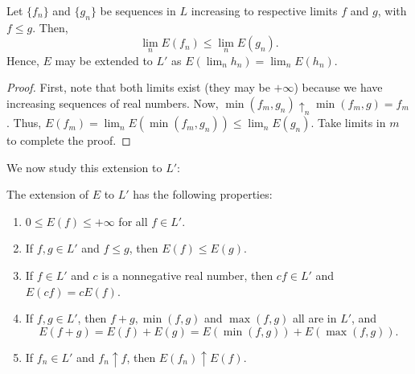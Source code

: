 \begin{lemm}\label{lemma:extension of E to L'}
		Let \(\{f_n\}\) and \(\{g_n\}\) be sequences in \(L\) increasing to respective limits \(f\) and \(g\), with \(f\leq g\). Then,
		\[
				\lim_n E(f_n)\leq\lim_n E(g_n)
		.\]
		Hence, \(E\) may be extended to \(L'\) as \(E(\lim_nh_n)=\lim_nE(h_n)\).
\end{lemm}
\begin{proof}
		First, note that both limits exist (they may be \(+\infty\)) because we have increasing sequences of real numbers.
		Now, \(\min(f_m,g_n)\uparrow_n\min(f_m,g)=f_m\). Thus, \(E(f_m)=\lim_n E(\min(f_m,g_n))\leq\lim_n E(g_n)\). Take limits in \(m\) to complete the proof.
\end{proof}
We now study this extension to \(L'\):
\begin{lemm}\label{lemma:properties of extension of E to L'}
		The extension of \(E\) to \(L'\) has the following properties:
		\begin{enumerate}
				\item\label{lemma:properties of extension of E to L' 1} \(0\leq E(f)\leq+\infty\) for all \(f\in L'\).
				\item\label{lemma:properties of extension of E to L' 2} If \(f,g\in L'\) and \(f\leq g\), then \(E(f)\leq E(g)\).
				\item\label{lemma:properties of extension of E to L' 3} If \(f\in L'\) and \(c\) is a nonnegative real number, then \(cf\in L'\) and \(E(cf)=cE(f)\).
				\item\label{lemma:properties of extension of E to L' 4} If \(f,g\in L'\), then \(f+g,\min(f,g)\) and \(\max(f,g)\) all are in \(L'\), and
				\[
						E(f+g)=E(f)+E(g)=E(\min(f,g))+E(\max(f,g))
				.\]
				\item\label{lemma:properties of extension of E to L' 5} If \(f_n\in L'\) and \(f_n\uparrow f\), then \(E(f_n)\uparrow E(f)\).
		\end{enumerate}
\end{lemm}
